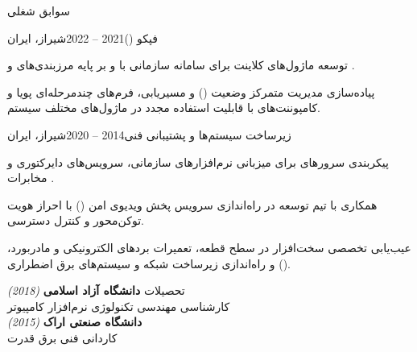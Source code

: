 \documentclass[
	a4paper,
	11pt,
]{resume_fa}
\begin{document}
\begin{rSection}{سوابق شغلی}
    \begin{rSubsection}{فپکو ()}{2021 -- 2022}{}{شیراز، ایران}
        \item توسعه ماژول‌های کلاینت برای سامانه سازمانی  با  و  بر پایه مرزبندی‌های  و .
        \item پیاده‌سازی مدیریت متمرکز وضعیت () و مسیریابی، فرم‌های چندمرحله‌ای پویا و کامپوننت‌های با قابلیت استفاده مجدد در ماژول‌های مختلف سیستم.
        \\      
    \end{rSubsection}

    \begin{rSubsection}{زیرساخت سیستم‌ها و پشتیبانی فنی}{2014 -- 2020}{}{شیراز، ایران}
        \item پیکربندی سرورهای  برای میزبانی نرم‌افزارهای سازمانی، سرویس‌های دایرکتوری و مخابرات .
        \item همکاری با تیم توسعه در راه‌اندازی سرویس پخش ویدیوی امن () با احراز هویت توکن‌محور و کنترل دسترسی.
        \item عیب‌یابی تخصصی سخت‌افزار در سطح قطعه، تعمیرات بردهای الکترونیکی و مادربورد، و راه‌اندازی زیرساخت شبکه و سیستم‌های برق اضطراری ().
        \\      
    \end{rSubsection}

\end{rSection}


\begin{rSection}{تحصیلات}
    \textbf{دانشگاه آزاد اسلامی} \hfill \textit{ (2018) \endL} \\
    کارشناسی مهندسی تکنولوژی نرم‌افزار کامپیوتر \\[2pt]
    \textbf{دانشگاه صنعتی اراک} \hfill \textit{ (2015) \endL} \\
    کاردانی فنی برق قدرت
\end{rSection}
\end{document}
